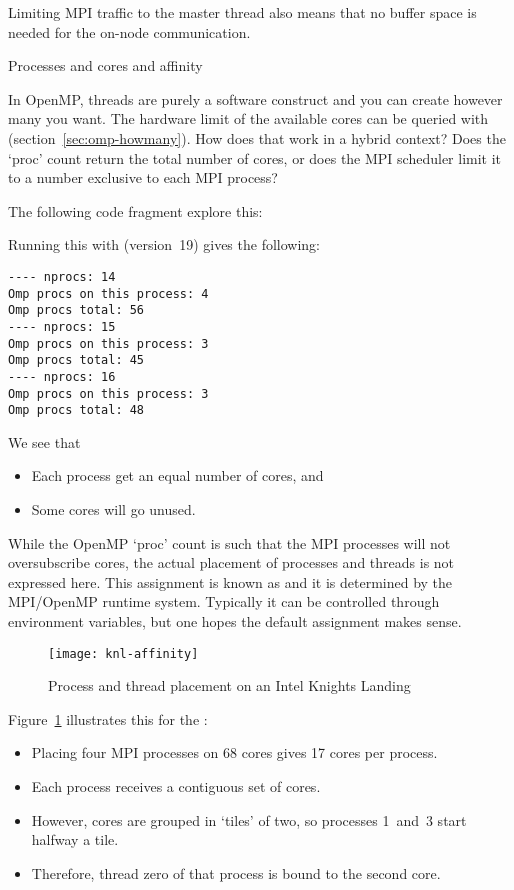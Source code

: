 Limiting MPI traffic to the master thread also means that no buffer
space is needed for the on-node communication.

 {Processes and cores and affinity}

In OpenMP, threads are purely a software construct and you can create
however many you want.
The hardware limit of the available cores can be queried with
 (section~\ref{sec:omp-howmany}).
How does that work in a hybrid context?
Does the `proc' count return the total number of cores,
or does the MPI scheduler limit it to a number exclusive to each MPI process?

The following code fragment explore this:


Running this with  (version~19)
gives the following:
\begin{verbatim}
---- nprocs: 14
Omp procs on this process: 4
Omp procs total: 56
---- nprocs: 15
Omp procs on this process: 3
Omp procs total: 45
---- nprocs: 16
Omp procs on this process: 3
Omp procs total: 48
\end{verbatim}
We see that
\begin{itemize}
\item Each process get an equal number of cores, and
\item Some cores will go unused.
\end{itemize}

While the OpenMP `proc' count is such that the MPI processes will not
oversubscribe cores, the actual placement of processes and threads
is not expressed here.
This assignment is known as  and it is
determined by the MPI/OpenMP runtime system.
Typically it can be controlled through environment variables,
but one hopes the default assignment makes sense.
\begin{figure}[ht]
  \texttt{[image: knl-affinity]}
  \caption{Process and thread placement on an Intel Knights Landing}
  \label{fig:knl-affinity}
\end{figure}
Figure~\ref{fig:knl-affinity} illustrates this for the
:
\begin{itemize}
\item Placing four MPI processes on 68 cores gives 17 cores per process.
\item Each process receives a contiguous set of cores.
\item However, cores are grouped in `tiles' of two, so processes 1~and~3 start
  halfway a tile.
\item Therefore, thread zero of that process is bound to the second core.
\end{itemize}

